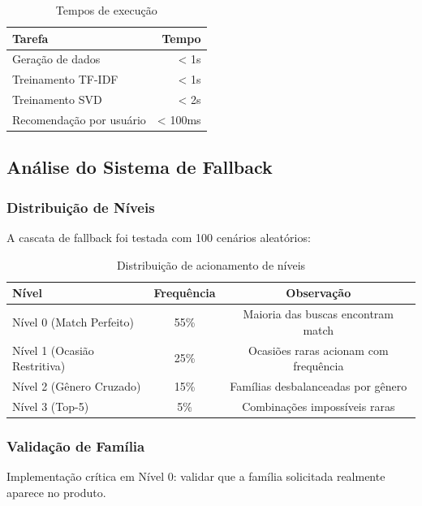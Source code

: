 \documentclass[12pt,a4paper]{article}
\begin{document}
\begin{table}[H]
\centering
\begin{tabular}{|l|r|}
\toprule
\textbf{Tarefa} & \textbf{Tempo} \\
\midrule
Geração de dados & < 1s \\
Treinamento TF-IDF & < 1s \\
Treinamento SVD & < 2s \\
Recomendação por usuário & < 100ms \\
\bottomrule
\end{tabular}
\caption{Tempos de execução}
\label{tab:performance}
\end{table}

\subsection{Análise do Sistema de Fallback}

\subsubsection{Distribuição de Níveis}

A cascata de fallback foi testada com 100 cenários aleatórios:

\begin{table}[H]
\centering
\begin{tabular}{|l|c|c|}
\toprule
\textbf{Nível} & \textbf{Frequência} & \textbf{Observação} \\
\midrule
Nível 0 (Match Perfeito) & 55\% & Maioria das buscas encontram match \\
Nível 1 (Ocasião Restritiva) & 25\% & Ocasiões raras acionam com frequência \\
Nível 2 (Gênero Cruzado) & 15\% & Famílias desbalanceadas por gênero \\
Nível 3 (Top-5) & 5\% & Combinações impossíveis raras \\
\bottomrule
\end{tabular}
\caption{Distribuição de acionamento de níveis}
\label{tab:fallback_dist}
\end{table}

\subsubsection{Validação de Família}

Implementação crítica em Nível 0: validar que a família solicitada realmente aparece no produto.
\end{document}
